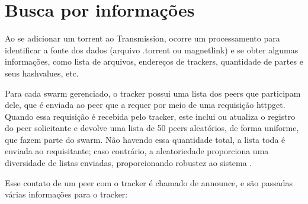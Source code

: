\section{Busca por informações}

Ao se adicionar um \gls*{torrent} ao Transmission, ocorre um processamento para
identificar a fonte dos dados (arquivo .torrent ou \gls*{magnetlink}) e se obter algumas
informações, como lista de arquivos, endereços de \glspl*{tracker}, quantidade de
partes e seus \glspl*{hashvalue}, etc.

\newpage
{}

Para cada \gls*{swarm} gerenciado, o \gls*{tracker} possui uma lista dos \glspl*{peer}
que participam dele, que é enviada ao \gls*{peer} que a requer por meio de uma
requisição \gls{httpget}. Quando essa requisição é recebida pelo \gls*{tracker}, este
inclui ou atualiza o registro do \gls*{peer} solicitante e devolve uma lista de 50
\glspl*{peer} aleatórios, de forma uniforme, que fazem parte do \gls*{swarm}. Não
havendo essa quantidade total, a lista toda é enviada ao requisitante; caso contrário,
a aleatoriedade proporciona uma diversidade de listas enviadas, proporcionando robustez
ao sistema \cite{wikitheory:tracker-response}.

Esse contato de um \gls*{peer} com o \gls*{tracker} é chamado de \gls{announce}, e são
passadas várias informações para o \gls*{tracker}:

